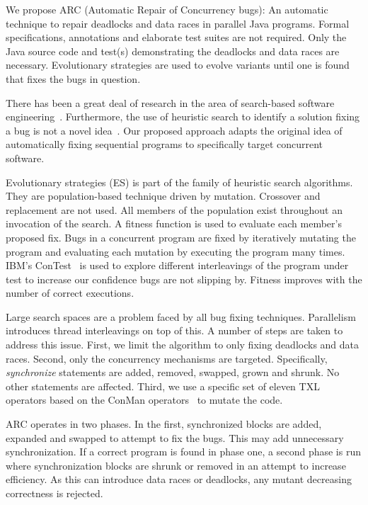 \documentclass[10pt, conference, compsocconf]{IEEEtran}
\begin{document}
We propose ARC (Automatic Repair of Concurrency bugs): An automatic technique
to repair deadlocks and data races in parallel Java programs. Formal
specifications, annotations and elaborate test suites are not required. Only
the Java source code and test(s) demonstrating the deadlocks and data races are
necessary. Evolutionary strategies are used to evolve variants until one is
found that fixes the bugs in question.

There has been a great deal of research in the area of search-based software
engineering~\cite{Har+10}. Furthermore, the use of heuristic search to identify
a solution fixing a bug is not a novel idea~\cite{FNWG09, AY08, Arc08, WT10,
WNLF09, WFGN10}. Our proposed approach adapts the original idea of
automatically fixing sequential programs to specifically target concurrent
software.

Evolutionary strategies (ES) is part of the family of heuristic search
algorithms. They are population-based technique driven by mutation. Crossover
and replacement are not used.  All members of the population exist throughout
an invocation of the search. A fitness function is used to evaluate each
member's proposed fix. Bugs in a concurrent program are fixed by iteratively
mutating the program and evaluating each mutation by executing the program many
times. IBM's ConTest~\cite{EFN+02} is used to explore different interleavings
of the program under test to increase our confidence bugs are not slipping by.
Fitness improves with the number of correct executions.

Large search spaces are a problem faced by all bug fixing techniques.
Parallelism introduces thread interleavings on top of this. A number of steps
are taken to address this issue.  First, we limit the algorithm to only fixing
deadlocks and data races. Second, only the concurrency mechanisms are targeted.
Specifically, \textit{synchronize} statements are added, removed, swapped,
grown and shrunk. No other statements are affected. Third, we use a specific
set of eleven TXL~\cite{CHP91} operators based on the ConMan
operators~\cite{BCD06} to mutate the code.

ARC operates in two phases. In the first, synchronized blocks are added,
expanded and swapped to attempt to fix the bugs. This may add unnecessary
synchronization. If a correct program is found in phase one, a second phase  is
run where synchronization blocks are shrunk or removed in an attempt to
increase efficiency. As this can introduce data races or deadlocks, any mutant
decreasing correctness is rejected.
\end{document}
